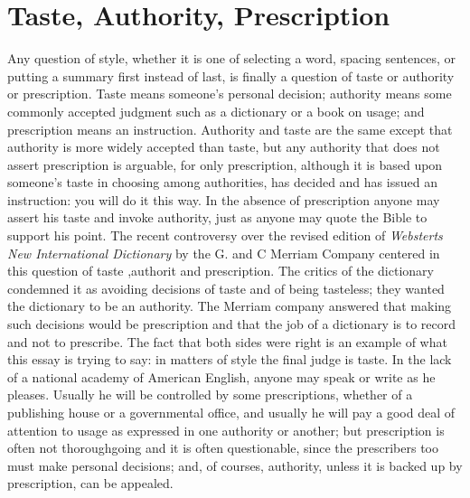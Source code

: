 \documentclass[
    oneside,
    11pt,
    draft
]{memoir}
\begin{document}
\chapter{Taste, Authority, Prescription}
Any question of style, whether it is one of selecting a word, spacing sentences, or putting a summary first instead of last, is finally a question of taste or authority or prescription. Taste means someone's personal decision; authority means some commonly accepted judgment such as a dictionary or a book on usage; and prescription means an instruction. Authority and taste are the same except that authority is more widely accepted than taste, but any authority that does not assert prescription is arguable, for only prescription, although it is based upon someone's taste in choosing among authorities, has decided and has issued an instruction: you will do it this way. In the absence of prescription anyone may assert his taste and invoke authority, just as anyone may quote the Bible to support his point. The recent controversy over the revised edition of \emph{Websterts New International Dictionary} by the G. and C Merriam Company centered in this question of taste ,authorit and prescription. The critics of the dictionary condemned it as avoiding decisions of taste and of being tasteless; they wanted the dictionary to be an authority. The Merriam company answered that making such decisions would be prescription and that the job of a dictionary is to record and not to prescribe. The fact that both sides were right is an example of what this essay is trying to say: in matters of style the final judge is taste. In the lack of a national academy of American English, anyone may speak or write as he pleases. Usually he will be controlled by some prescriptions, whether of a publishing house or a governmental office, and usually he will pay a good deal of attention to usage as expressed in one authority or another; but prescription is often not thoroughgoing and it is often questionable, since the prescribers too must make personal decisions; and, of courses, authority, unless it is backed up by prescription, can be appealed. 
\end{document}
